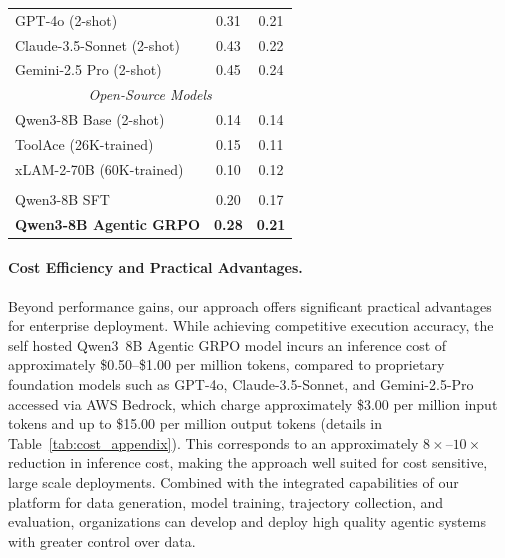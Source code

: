 \documentclass{article}
\theoremstyle{plain}
\theoremstyle{definition}
\theoremstyle{remark}
\begin{document}
\begin{table}[t]
\begin{minipage}[t]{0.38\textwidth}
\begin{tabular}{l|cc}
\midrule
\rowcolor{GrayRow}
GPT-4o (2-shot) & 0.31 & 0.21 \\
\rowcolor{GrayRow}
Claude-3.5-Sonnet (2-shot) & 0.43 & 0.22 \\
\rowcolor{GrayRow}
Gemini-2.5 Pro (2-shot) & 0.45 & 0.24 \\
\midrule
\multicolumn{3}{c}{\textit{Open-Source Models}} \\
\midrule
\rowcolor{OpenSourceRow}
Qwen3-8B Base (2-shot) & 0.14 & 0.14 \\
\rowcolor{OpenSourceRow}
ToolAce (26K-trained) & 0.15 & 0.11 \\
\rowcolor{OpenSourceRow}
xLAM-2-70B (60K-trained) & 0.10 & 0.12 \\[2pt]
\rowcolor{OpenSourceRow}
\multicolumn{3}{c}{\underline{\textit{Our Platform-Trained Models ($<$1K)}}} \\[2pt]
\rowcolor{OpenSourceRow}
Qwen3-8B SFT & 0.20 & 0.17 \\
\rowcolor{OpenSourceRow}
\textbf{Qwen3-8B Agentic GRPO} & \textbf{0.28} & \textbf{0.21} \\
\bottomrule
\end{tabular}
\end{minipage}
\end{table}

\vspace{-0.2cm}
\paragraph{Cost Efficiency and Practical Advantages.}
Beyond performance gains, our approach offers significant practical advantages for enterprise deployment. While achieving competitive execution accuracy, the self hosted Qwen3~8B Agentic GRPO model incurs an inference cost of approximately \$0.50--\$1.00 per million tokens, compared to proprietary foundation models such as GPT-4o, Claude-3.5-Sonnet, and Gemini-2.5-Pro accessed via AWS Bedrock, which charge approximately \$3.00 per million input tokens and up to \$15.00 per million output tokens (details in Table~\ref{tab:cost_appendix}). This corresponds to an approximately $8\times$--$10\times$ reduction in inference cost, making the approach well suited for cost sensitive, large scale deployments. Combined with the integrated capabilities of our platform for data generation, model training, trajectory collection, and evaluation, organizations can develop and deploy high quality agentic systems with greater control over data.

\vspace{-0.2cm}
\end{document}
